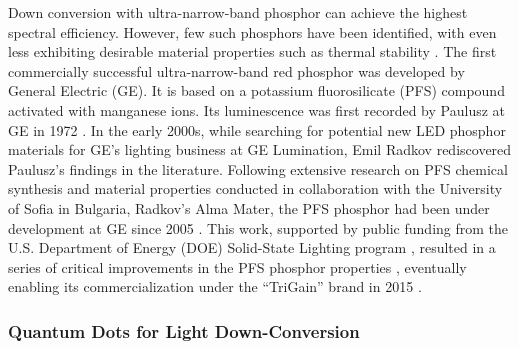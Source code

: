 \documentclass[10pt]{article}
\begin{document}
Down conversion with ultra-narrow-band phosphor can achieve the highest spectral efficiency. However, few such phosphors have been identified, with even less exhibiting desirable material properties such as thermal stability \cite{Phillips2007}. The first commercially successful ultra-narrow-band red phosphor was developed by General Electric (GE). It is based on a potassium fluorosilicate (PFS) compound activated with manganese ions. Its luminescence was first recorded by Paulusz at GE in 1972 \cite{paulusz1973efficient}. In the early 2000s, while searching for potential new LED phosphor materials for GE’s lighting business at GE Lumination, Emil Radkov rediscovered Paulusz’s findings in the literature. Following extensive research on PFS chemical synthesis and material properties conducted in collaboration with the University of Sofia in Bulgaria, Radkov’s Alma Mater, the PFS phosphor had been under development at GE since 2005 \cite{radkov2006red}\cite{radkov2009red}. This work, supported by public funding from the U.S. Department of Energy (DOE) Solid-State Lighting program , resulted in a series of critical improvements in the PFS phosphor properties \cite{Setlur2010}\cite{lyons2012color}, eventually enabling its commercialization under the “TriGain” brand in 2015 \cite{trigain_spectrum}\cite{setlur2015trigain}\cite{Murphy2015}.

\subsubsection{Quantum Dots for Light Down-Conversion}
\end{document}
